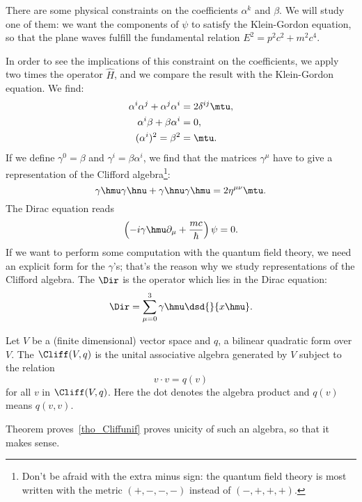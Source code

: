 There are some physical constraints on the coefficients $\alpha^k$ and $\beta$. We will study one of them: we want the components of $\psi$ to satisfy the Klein-Gordon equation, so that the plane waves fulfill the fundamental relation $E^2=p^2c^2+m^2c^4$.

In order to see the implications of this constraint on the coefficients, we apply two times the operator $\hat{H}$, and we compare the result with the Klein-Gordon equation. We find:
\begin{subequations}
	\begin{align}
		\alpha^i\alpha^j+\alpha^j\alpha^i & =2\delta^{ij}\mtu, \\
		\alpha^i\beta+\beta\alpha^i       & =0,                \\
		(\alpha^i)^2=\beta^2              & =\mtu.
	\end{align}
\end{subequations}
%
If we define $\gamma^0=\beta$ and $\gamma^i=\beta\alpha^i$, we find that the matrices $\gamma^{\mu}$ have to give a representation of the Clifford algebra\footnote{Don't be afraid with the extra minus sign: the quantum field theory is most written with the metric $(+,-,-,-)$ instead of $(-,+,+,+)$.}:
\begin{equation}\label{cliffphys}
	\gamma\hmu\gamma\hnu+\gamma\hnu\gamma\hmu=2\eta^{\mu\nu}\mtu.
\end{equation}
The Dirac equation reads
\[
	\left(-i\gamma\hmu\partial_{\mu}+\frac{mc}{\hbar}\right)\psi=0.
\]
If we want to perform some computation with the quantum field theory, we need an explicit form for the $\gamma$'s; that's the reason why we study representations of the Clifford algebra. The  $\Dir$ is the operator which lies in the Dirac equation:
\begin{equation}
	\label{dirflat}\Dir=\sum_{\mu=0}^3\gamma\hmu\dsd{}{x\hmu}.
\end{equation}


\begin{definition}
	Let $V$ be a (finite dimensional) vector space and $q$, a bilinear quadratic form over $V$. The  $\Cliff(V,q)$ is the unital associative algebra generated by $V$ subject to the relation
	\begin{equation}\label{501r1}
		v\cdot v=q(v)
	\end{equation}
	for all $v$ in $\Cliff(V,q)$. Here the dot denotes the algebra product and $q(v)$ means $q(v,v)$.
\end{definition}
Theorem proves~\ref{tho_Cliffunif} proves unicity of such an algebra, so that it makes sense.

